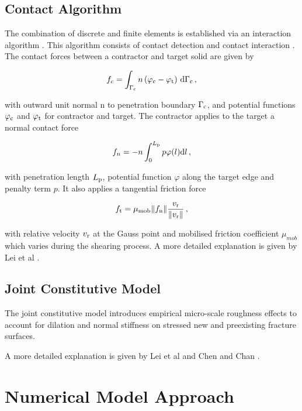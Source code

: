 \documentclass[12pt,twoside]{article}
\theoremstyle{break}
\begin{document}
\subsection{Contact Algorithm}

The combination of discrete and finite elements is established via an interaction algorithm \cite{Lei16}. This algorithm consists of contact detection \cite{Che15} and contact interaction \cite{Mun13}. The contact forces between a contractor and target solid are given by

\begin{equation}
    f_c=\int_{\Gamma_{\rm{c}}}n\left(\varphi_{\rm{c}}-\varphi_{\rm{t}}\right)\,{\rm{d}}\Gamma_{\rm{c}}\,,
\end{equation}

with outward unit normal n to penetration boundary $\Gamma_{\rm{c}}$, and potential functions $\varphi_{\rm{c}}$ and $\varphi_{\rm{t}}$ for contractor and target. The contractor applies to the target a normal contact force

\begin{equation}
    f_n=-n\int_0^{L_{\rm{p}}} p\varphi(l){\rm{d}}l\,,
\end{equation}

with penetration length $L_{\rm{p}}$, potential function $\varphi$ along the target edge and penalty term $p$. It also applies a tangential friction force 

\begin{equation}
    f_{\rm{t}}=\mu_{\rm{mob}}\lVert f_{\rm{n}} \rVert\frac{v_{\rm{r}}}{\lVert v_{\rm{r}}\rVert}\,,
\end{equation}

with relative velocity $v_{\rm{r}}$ at the Gauss point and mobilised friction coefficient $\mu_{mob}$ which varies during the shearing process. A more detailed explanation is given by Lei et al \cite{Lei16}.

\subsection{Joint Constitutive Model}

 The joint constitutive model \cite{Lat15} introduces empirical micro-scale roughness effects to account for dilation and normal stiffness on stressed new and preexisting fracture surfaces.
 
 \bigbreak
 A more detailed explanation is given by Lei et al \cite{Lei16} and Chen and Chan \cite{Che18}.

\section{Numerical Model Approach}
\end{document}

